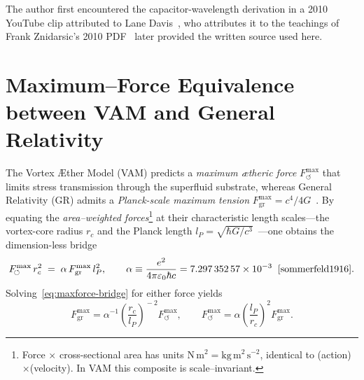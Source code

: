 

    The author first encountered the capacitor-wavelength derivation in a 2010 YouTube clip attributed to Lane Davis~\cite{davis2010_video}, who attributes it to the teachings of Frank Znidarsic's 2010 PDF~\cite{znidarsic2010} later provided the written source used here.


\section{Maximum–Force Equivalence between VAM and General Relativity}
\label{sec:maxforce-equivalence}

    The Vortex Æther Model (VAM) predicts a \emph{maximum ætheric force} \(F^{\max}_{\!\boldsymbol{\circlearrowleft}}\) that limits stress transmission through the superfluid substrate, whereas General Relativity (GR) admits a \emph{Planck-scale maximum tension} \(F_{\mathrm{gr}}^{\max}=c^{4}/4G\)~\cite{gibbons2002}.
    By equating the \emph{area–weighted forces}\footnote{Force $\times$ cross-sectional area has units $\mathrm{N\,m^{2}}=\mathrm{kg\,m^{2}\,s^{-2}}$, identical to (action)$\times$(velocity).  In VAM this composite is scale--invariant.} at their characteristic length scales—the vortex-core radius \(r_{c}\) and the Planck length \(l_{P}=\sqrt{\hbar G/c^{3}}\)~\cite{planck1899}—one obtains the dimension-less bridge
    \begin{equation}
        F^{\max}_{\!\boldsymbol{\circlearrowleft}}\,r_{c}^{2}
        \;=\;
        \alpha\,F_{\mathrm{gr}}^{\max}\,l_{P}^{2},
        \qquad
        \alpha
        \equiv
        \frac{e^{2}}{4\pi\varepsilon_{0}\hbar c}
        =7.297\,352\,57\times10^{-3}
        \;\;\cite{sommerfeld1916}.
        \label{eq:maxforce-bridge}
    \end{equation}
    Solving~\eqref{eq:maxforce-bridge} for either force yields
    \begin{equation}
        F_{\mathrm{gr}}^{\max}
        =
        \alpha^{-1}
        \!\left(\frac{r_{c}}{l_{P}}\right)^{\!-2}\!
        F^{\max}_{\!\boldsymbol{\circlearrowleft}},
        \qquad
        F^{\max}_{\!\boldsymbol{\circlearrowleft}}
        =
        \alpha
        \!\left(\frac{l_{P}}{r_{c}}\right)^{\!2}\!
        F_{\mathrm{gr}}^{\max}.
        \label{eq:maxforce-rescale}
    \end{equation}

